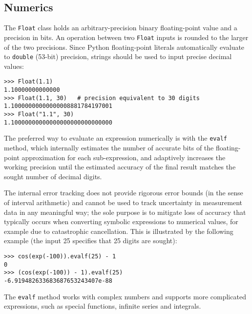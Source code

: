 


\subsection{Numerics}

The \texttt{Float} class holds an arbitrary-precision binary floating-point value
and a precision in bits. An operation between two \texttt{Float}
inputs is rounded to the larger of the two precisions.
Since Python floating-point literals automatically evaluate to \texttt{double}
(53-bit) precision, strings should be used to input precise decimal values:

\begin{verbatim}
>>> Float(1.1)
1.10000000000000
>>> Float(1.1, 30)   # precision equivalent to 30 digits
1.10000000000000008881784197001
>>> Float("1.1", 30)
1.10000000000000000000000000000
\end{verbatim}

The preferred way to evaluate an expression numerically is with the
\texttt{evalf} method, which internally estimates the number of accurate
bits of the floating-point
approximation for each sub-expression, and adaptively increases the
working precision until the estimated accuracy of the
final result matches the sought number of decimal digits.

The internal error tracking does not provide rigorous error bounds
(in the sense of interval arithmetic) and cannot be used to track
uncertainty in measurement data in any meaningful way;
the sole purpose is to mitigate loss of accuracy that typically occurs
when converting symbolic expressions to numerical values, for example
due to catastrophic cancellation. This is illustrated by the following
example (the input 25 specifies that 25 digits are sought):

\begin{verbatim}
>>> cos(exp(-100)).evalf(25) - 1
0
>>> (cos(exp(-100)) - 1).evalf(25)
-6.919482633683687653243407e-88
\end{verbatim}

The \texttt{evalf} method works with complex numbers and supports
more complicated expressions, such as
special functions, infinite series and integrals.

